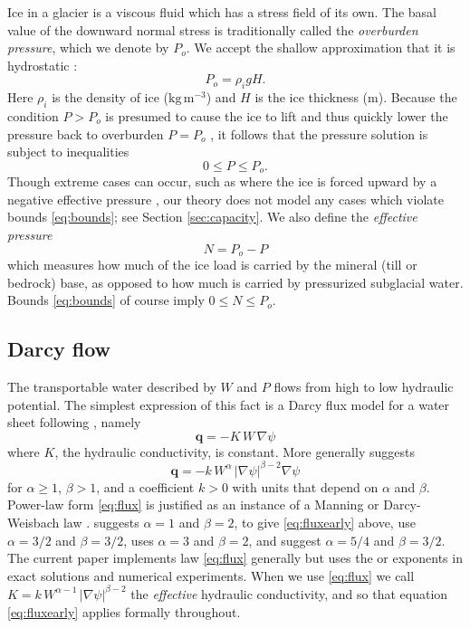 \documentclass[11pt,final]{amsart}
\newcommand\bq{\mathbf{q}}
\newcommand{\grad}{\nabla}
\begin{document}
Ice in a glacier is a viscous fluid which has a stress field of its own.  The basal value of the downward normal stress is traditionally called the \emph{overburden pressure}, which we denote by $P_o$.  We accept the shallow approximation that it is hydrostatic \citep{GreveBlatter2009}:
\begin{equation} \label{eq:hydrostatic}
  P_o = \rho_i g H.
\end{equation}
Here $\rho_i$ is the density of ice ($\text{kg}\,\text{m}^{-3}$) and $H$ is the ice thickness (m).  Because the condition $P>P_o$ is presumed to cause the ice to lift and thus quickly lower the pressure back to overburden $P=P_o$ \citep{Schoofetal2012}, it follows that the pressure solution is subject to inequalities
\begin{equation}
0 \le P \le P_o. \label{eq:bounds}
\end{equation}
Though extreme cases can occur, such as where the ice is forced upward by a negative effective pressure \citep{Schoofetal2012}, our theory does not model any cases which  violate bounds \eqref{eq:bounds}; see Section \ref{sec:capacity}.  We also define the \emph{effective pressure}
\begin{equation}
N = P_o - P  \label{eq:effective}
\end{equation}
which measures how much of the ice load is carried by the mineral (till or bedrock) base, as opposed to how much is carried by pressurized subglacial water.  Bounds \eqref{eq:bounds} of course imply $0 \le N \le P_o$.

\subsection*{Darcy flow}  The transportable water described by $W$ and $P$ flows from high to low hydraulic potential.  The simplest expression of this fact is a Darcy flux model for a water sheet following \cite{Clarke05}, namely
\begin{equation}  \label{eq:fluxearly}
\bq = - K \,W\, \grad \psi
\end{equation}
where $K$, the hydraulic conductivity, is constant.  More generally \cite{Schoofetal2012} suggests
\begin{equation}  \label{eq:flux}
\bq = - k\, W^\alpha\, |\grad \psi|^{\beta-2} \grad \psi
\end{equation}
for $\alpha \ge 1$, $\beta>1$, and a coefficient $k>0$ with units that depend on $\alpha$ and $\beta$.  Power-law form \eqref{eq:flux} is justified as an instance of a Manning or Darcy-Weisbach law \citep{Schoofetal2012}.  \cite{Clarke05} suggests $\alpha=1$ and $\beta=2$, to give \eqref{eq:fluxearly} above, \cite{CreytsSchoof2009} use $\alpha=3/2$ and $\beta=3/2$, \cite{Hewitt2011,Hewitt2013} uses $\alpha=3$ and $\beta = 2$, and \cite{Hewittetal2012} suggest $\alpha=5/4$ and $\beta=3/2$.  The current paper implements law \eqref{eq:flux} generally but uses the \cite{Clarke05} or \cite{Hewittetal2012} exponents in exact solutions and numerical experiments.  When we use \eqref{eq:flux} we call $K = k\, W^{\alpha-1}\, |\grad \psi|^{\beta-2}$ the \emph{effective} hydraulic conductivity, and so that equation \eqref{eq:fluxearly} applies formally throughout.
\end{document}
